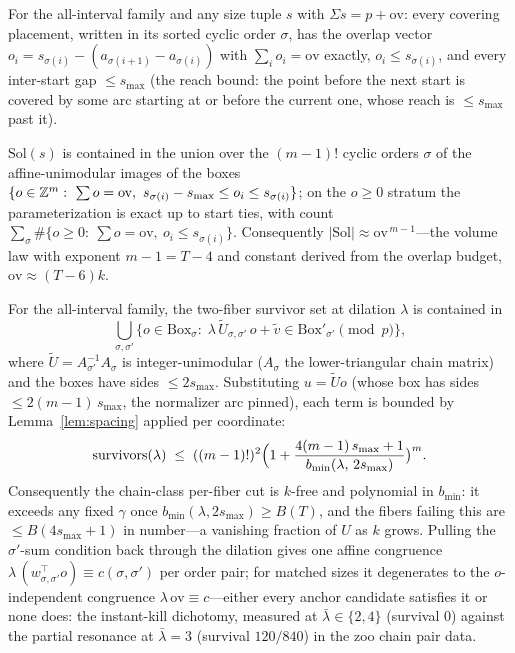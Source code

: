 \begin{lemma}\label{lem:overlapsum}
For the all-interval family and any size tuple $s$ with
$\Sigma s=p+\mathrm{ov}$: every covering placement, written in its
sorted cyclic order $\sigma$, has the overlap vector
$o_i=s_{\sigma(i)}-(a_{\sigma(i+1)}-a_{\sigma(i)})$ with
$\sum_i o_i=\mathrm{ov}$ exactly, $o_i\le s_{\sigma(i)}$, and every
inter-start gap $\le s_{\max}$ (the reach bound: the point before the
next start is covered by some arc starting at or before the current
one, whose reach is $\le s_{\max}$ past it).
\end{lemma}

\begin{lemma}\label{lem:chainbox}
$\mathrm{Sol}(s)$ is contained in the union over the $(m-1)!$ cyclic
orders $\sigma$ of the affine-unimodular images of the boxes
$\{o\in\Z^m:\ \sum o=\mathrm{ov},\ s_{\sigma(i)}-s_{\max}\le o_i\le
s_{\sigma(i)}\}$; on the $o\ge0$ stratum the parameterization is exact
up to start ties, with count
$\sum_\sigma\#\{o\ge0:\ \sum o=\mathrm{ov},\ o_i\le s_{\sigma(i)}\}$.
Consequently $|\mathrm{Sol}|\approx\mathrm{ov}^{\,m-1}$---the volume
law with exponent $m-1=T-4$ and constant derived from the overlap
budget, $\mathrm{ov}\approx(T-6)k$.
\end{lemma}

\begin{theorem}\label{thm:chaindilate}
For the all-interval family, the two-fiber survivor set at dilation
$\lambda$ is contained in
\[
\bigcup_{\sigma,\sigma'}\bigl\{o\in\mathrm{Box}_\sigma:\;
\lambda\,\tilde U_{\sigma,\sigma'}\,o+\tilde v\in
\mathrm{Box}'_{\sigma'}\pmod p\bigr\},
\]
where $\tilde U=A_{\sigma'}^{-1}A_\sigma$ is integer-unimodular
($A_\sigma$ the lower-triangular chain matrix) and the boxes have
sides $\le 2s_{\max}$. Substituting $u=\tilde Uo$ (whose box has sides
$\le 2(m{-}1)\,s_{\max}$, the normalizer arc pinned), each term is bounded by
Lemma~\ref{lem:spacing} applied per coordinate:
\[
\mathrm{survivors}(\lambda)\;\le\;((m-1)!)^2
\Bigl(1+\frac{4(m-1)\,s_{\max}+1}{b_{\min}(\lambda,\,2s_{\max})}\bigr)^{m}.
\]
Consequently the chain-class per-fiber cut is $k$-free and polynomial
in $b_{\min}$: it exceeds any fixed $\gamma$ once
$b_{\min}(\lambda,2s_{\max})\ge B(T)$, and the fibers failing this are
$\le B(4s_{\max}+1)$ in number---a vanishing fraction of $U$ as $k$
grows. Pulling the $\sigma'$-sum condition back through the dilation
gives one affine congruence
$\lambda\,(w^\top_{\sigma,\sigma'}o)\equiv c(\sigma,\sigma')$ per
order pair; for matched sizes it degenerates to the $o$-independent
congruence $\lambda\,\mathrm{ov}\equiv c$---either every anchor
candidate satisfies it or none does: the instant-kill dichotomy,
measured at $\bar\lambda\in\{2,4\}$ (survival $0$) against the partial
resonance at $\bar\lambda=3$ (survival $120/840$) in the zoo chain pair
data.
\end{theorem}

